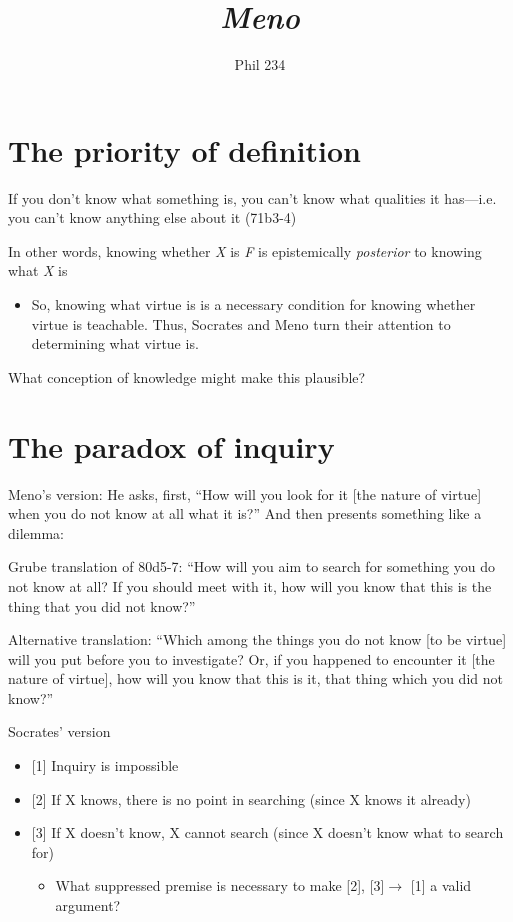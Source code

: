 \documentclass[11pt]{article}
\begin{document}
\author{Phil 234}
\title{\emph{Meno}}
\maketitle



\section*{The priority of definition}

\noindent If you don't know what something is, you can't know what qualities it has---i.e. you can't know anything else about it (71b3-4)
\vspace*{2mm}

\noindent In other words, knowing whether \emph{X} is \emph{F} is epistemically \emph{posterior} to knowing what \emph{X} is

\begin{itemize}\item{So, knowing what virtue is is a necessary condition for knowing whether virtue is teachable. Thus, Socrates and Meno turn their attention to determining what virtue is.}\end{itemize}

\noindent What conception of knowledge might make this plausible?

\section*{The paradox of inquiry}

\noindent Meno's version: He asks, first, ``How will you look for it [the nature of virtue] when you do not know at all what it is?'' And then presents something like a dilemma:
\vspace*{2mm}

\noindent Grube translation of 80d5-7: ``How will you aim to search for something you do not know at all? If you should meet with it, how will you know that this is the thing that you did not know?''
\vspace*{2mm}

\noindent Alternative translation: ``Which among the things you do not know [to be virtue] will you put before you to investigate? Or, if you happened to encounter it [the nature of virtue], how will you know that this is it, that thing which you did not know?''
\vspace*{2mm}

\noindent Socrates' version
\begin{itemize}\item{[1] Inquiry is impossible}\item{[2] If X knows, there is no point in searching (since X knows it already)}\item{[3] If X doesn't know, X cannot search (since X doesn't know what to search for)}\begin{itemize}\item{What suppressed premise is necessary to make [2], [3]$\rightarrow$ [1] a valid argument?}\end{itemize}\end{itemize}
\end{document}
